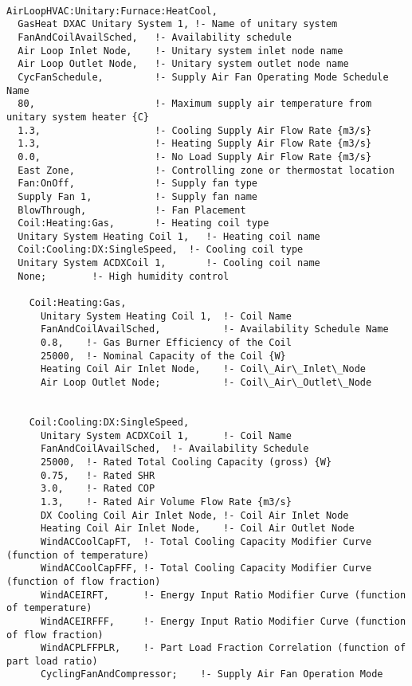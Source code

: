 \begin{lstlisting}

AirLoopHVAC:Unitary:Furnace:HeatCool,
  GasHeat DXAC Unitary System 1, !- Name of unitary system
  FanAndCoilAvailSched,   !- Availability schedule
  Air Loop Inlet Node,    !- Unitary system inlet node name
  Air Loop Outlet Node,   !- Unitary system outlet node name
  CycFanSchedule,         !- Supply Air Fan Operating Mode Schedule Name
  80,                     !- Maximum supply air temperature from unitary system heater {C}
  1.3,                    !- Cooling Supply Air Flow Rate {m3/s}
  1.3,                    !- Heating Supply Air Flow Rate {m3/s}
  0.0,                    !- No Load Supply Air Flow Rate {m3/s}
  East Zone,              !- Controlling zone or thermostat location
  Fan:OnOff,              !- Supply fan type
  Supply Fan 1,           !- Supply fan name
  BlowThrough,            !- Fan Placement
  Coil:Heating:Gas,       !- Heating coil type
  Unitary System Heating Coil 1,   !- Heating coil name
  Coil:Cooling:DX:SingleSpeed,  !- Cooling coil type
  Unitary System ACDXCoil 1,       !- Cooling coil name
  None;        !- High humidity control

    Coil:Heating:Gas,
      Unitary System Heating Coil 1,  !- Coil Name
      FanAndCoilAvailSched,           !- Availability Schedule Name
      0.8,    !- Gas Burner Efficiency of the Coil
      25000,  !- Nominal Capacity of the Coil {W}
      Heating Coil Air Inlet Node,    !- Coil\_Air\_Inlet\_Node
      Air Loop Outlet Node;           !- Coil\_Air\_Outlet\_Node


    Coil:Cooling:DX:SingleSpeed,
      Unitary System ACDXCoil 1,      !- Coil Name
      FanAndCoilAvailSched,  !- Availability Schedule
      25000,  !- Rated Total Cooling Capacity (gross) {W}
      0.75,   !- Rated SHR
      3.0,    !- Rated COP
      1.3,    !- Rated Air Volume Flow Rate {m3/s}
      DX Cooling Coil Air Inlet Node, !- Coil Air Inlet Node
      Heating Coil Air Inlet Node,    !- Coil Air Outlet Node
      WindACCoolCapFT,  !- Total Cooling Capacity Modifier Curve (function of temperature)
      WindACCoolCapFFF, !- Total Cooling Capacity Modifier Curve (function of flow fraction)
      WindACEIRFT,      !- Energy Input Ratio Modifier Curve (function of temperature)
      WindACEIRFFF,     !- Energy Input Ratio Modifier Curve (function of flow fraction)
      WindACPLFFPLR,    !- Part Load Fraction Correlation (function of part load ratio)
      CyclingFanAndCompressor;    !- Supply Air Fan Operation Mode



\end{lstlisting}
